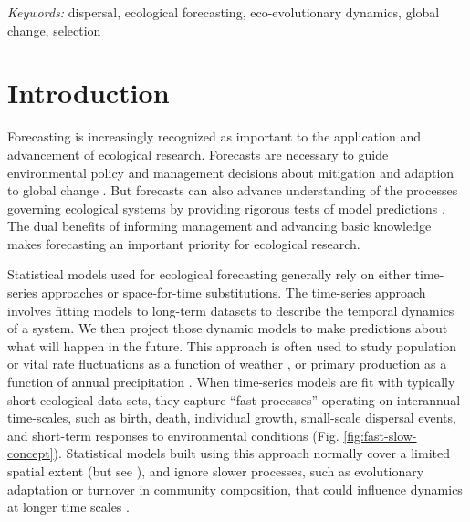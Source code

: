 \documentclass[11pt]{article}
\begin{document}
\vspace{0.25cm}

\noindent \emph{Keywords:} dispersal, ecological forecasting, eco-evolutionary dynamics, global change, selection

\section*{Introduction}

Forecasting is increasingly recognized as important to the application and advancement of ecological research.
Forecasts are necessary to guide environmental policy and management
decisions about mitigation and adaption to global change \citep{clark_ecological_2001,mouquet_review:_2015,dietze_iterative_2018}.
But forecasts can also advance understanding of the processes governing ecological systems by providing rigorous tests of 
model predictions \citep{houlahan_priority_2017,dietze_prediction_2017,dietze_iterative_2018}.
The dual benefits of informing management and advancing basic knowledge 
makes forecasting an important priority for ecological research.

Statistical models used for ecological forecasting generally rely on either time-series approaches or space-for-time substitutions. The time-series approach involves fitting models to long-term datasets to describe the temporal dynamics of a system.  We then project those dynamic models to make predictions about what will happen in the future. This approach is often used to study population or vital rate fluctuations as a function of weather \citep{dalgleish_climate_2011}, or primary production as a function of annual precipitation \citep{lauenroth_long-term_1992}. When time-series models are fit with typically short ecological data sets, they capture ``fast processes'' operating on interannual time-scales, such as birth, death, individual growth, small-scale dispersal events, and short-term responses to environmental conditions (Fig. \ref{fig:fast-slow-concept}). Statistical models built using this approach normally cover a limited spatial extent (but see \citealt{Hefley2017,kleinhesselink_response_2018,Chevalier}), and ignore slower processes, such as evolutionary adaptation or turnover in community composition, that could influence dynamics at longer time scales \citep{clark_ecological_2001}. 
\end{document}
